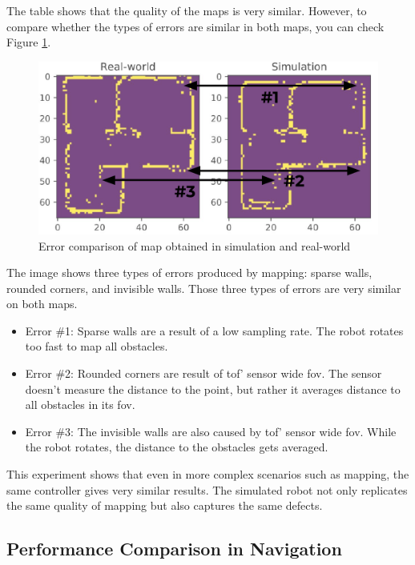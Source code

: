 The table shows that the quality of the maps is very similar.
However, to compare whether the types of errors are similar in both maps, you can check Figure \ref{fig:results:map_features}.

\begin{figure}[H]
    \centering
    \includegraphics[width=\textwidth]{./results/figures/map_features.pdf}
    \caption{Error comparison of map obtained in simulation and real-world}
    \label{fig:results:map_features}
\end{figure}

The image shows three types of errors produced by mapping: sparse walls, rounded corners, and invisible walls.
Those three types of errors are very similar on both maps.
\begin{itemize}
    \item Error \#1: Sparse walls are a result of a low sampling rate. The robot rotates too fast to map all obstacles.
    \item Error \#2: Rounded corners are result of \ac{tof}' sensor wide \ac{fov}. The sensor doesn't measure the distance to the point, but rather it averages distance to all obstacles in its \ac{fov}.
    \item Error \#3: The invisible walls are also caused by \ac{tof}' sensor wide \ac{fov}. While the robot rotates, the distance to the obstacles gets averaged.
\end{itemize}

This experiment shows that even in more complex scenarios such as mapping, the same controller gives very similar results.
The simulated robot not only replicates the same quality of mapping but also captures the same defects. 

\subsection{Performance Comparison in Navigation}
\label{results:subsec:phy_navigation}

